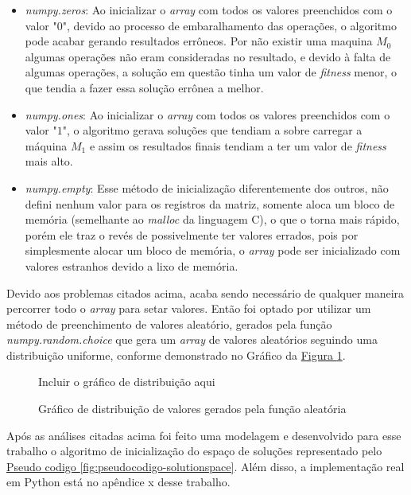 \begin{itemize}
    \item \textit{numpy.zeros}: Ao inicializar o \textit{array} com todos os valores preenchidos com o valor "$0$", devido ao processo de embaralhamento das operações, o algoritmo pode acabar gerando resultados errôneos. Por não existir uma maquina $M_0$ algumas operações não eram consideradas no resultado, e devido à falta de algumas operações, a solução em questão tinha um valor de \textit{fitness} menor, o que tendia a fazer essa solução errônea a melhor.

    \item \textit{numpy.ones}: Ao inicializar o \textit{array} com todos os valores preenchidos com o valor "$1$", o algoritmo gerava soluções que tendiam a sobre carregar a máquina $M_1$ e assim os resultados finais tendiam a ter um valor de \textit{fitness} mais alto.

    \item \textit{numpy.empty}: Esse método de inicialização diferentemente dos outros, não defini nenhum valor para os registros da matriz, somente aloca um bloco de memória (semelhante ao \textit{malloc} da linguagem C), o que o torna mais rápido, porém ele traz o revés de possivelmente ter valores errados, pois por simplesmente alocar um bloco de memória, o \textit{array} pode ser inicializado com valores estranhos devido a lixo de memória.
\end{itemize}

\noindent Devido aos problemas citados acima, acaba sendo necessário de qualquer maneira percorrer todo o \textit{array} para setar valores. \newline 
Então foi optado por utilizar um método de preenchimento de valores aleatório, 
gerados pela função \textit{numpy.random.choice} que gera um \textit{array} de valores aleatórios seguindo uma distribuição uniforme, 
conforme demonstrado no Gráfico da \hyperref[fig:distrib-uniforme]{Figura \ref{fig:distrib-uniforme}}.

\begin{figure}[ht]
    \centering
    \small{Incluir o gráfico de distribuição aqui}
    \caption{Gráfico de distribuição de valores gerados pela função aleatória}
    \label{fig:distrib-uniforme}
\end{figure}

%

Após as análises citadas acima foi feito uma modelagem e desenvolvido para esse trabalho o algoritmo de inicialização do espaço de soluções representado pelo 
\hyperref[fig:pseudocodigo-solutionspace]{Pseudo codigo \ref{fig:pseudocodigo-solutionspace}}. 
Além disso, a implementação real em Python está no apêndice x desse trabalho.\hfill

